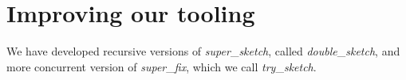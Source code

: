 \documentclass[10pt,conference]{IEEEtran}
\begin{document}

\section{Improving our tooling}
We have developed recursive versions of \textit{super}\_\textit{sketch}, called
\textit{double}\_\textit{sketch}, and more concurrent version of \textit{super}\_\textit{fix}, which we call \textit{try}\_\textit{sketch}. 
\end{document}
